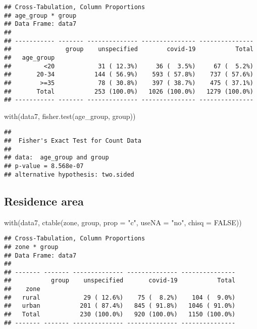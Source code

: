 \documentclass[
]{article}
\newenvironment{Shaded}{\begin{snugshade}}{\end{snugshade}}
\newcommand{\AttributeTok}[1]{\textcolor[rgb]{0.77,0.63,0.00}{#1}}
\newcommand{\ConstantTok}[1]{\textcolor[rgb]{0.00,0.00,0.00}{#1}}
\newcommand{\FunctionTok}[1]{\textcolor[rgb]{0.00,0.00,0.00}{#1}}
\newcommand{\NormalTok}[1]{#1}
\newcommand{\StringTok}[1]{\textcolor[rgb]{0.31,0.60,0.02}{#1}}
\begin{document}
\begin{verbatim}
## Cross-Tabulation, Column Proportions  
## age_group * group  
## Data Frame: data7  
## 
## ----------- ------- -------------- --------------- ---------------
##               group    unspecified        covid-19           Total
##   age_group                                                       
##         <20            31 ( 12.3%)     36 (  3.5%)     67 (  5.2%)
##       20-34           144 ( 56.9%)    593 ( 57.8%)    737 ( 57.6%)
##        >=35            78 ( 30.8%)    397 ( 38.7%)    475 ( 37.1%)
##       Total           253 (100.0%)   1026 (100.0%)   1279 (100.0%)
## ----------- ------- -------------- --------------- ---------------
\end{verbatim}

\begin{Shaded}
\begin{Highlighting}[]
\FunctionTok{with}\NormalTok{(data7, }\FunctionTok{fisher.test}\NormalTok{(age\_group, group))}
\end{Highlighting}
\end{Shaded}

\begin{verbatim}
## 
##  Fisher's Exact Test for Count Data
## 
## data:  age_group and group
## p-value = 8.568e-07
## alternative hypothesis: two.sided
\end{verbatim}

\hypertarget{residence-area}{%
\subsection{Residence area}\label{residence-area}}

\begin{Shaded}
\begin{Highlighting}[]
\FunctionTok{with}\NormalTok{(data7, }\FunctionTok{ctable}\NormalTok{(zone, group, }\AttributeTok{prop =} \StringTok{"c"}\NormalTok{, }\AttributeTok{useNA =} \StringTok{"no"}\NormalTok{, }\AttributeTok{chisq =} \ConstantTok{FALSE}\NormalTok{))}
\end{Highlighting}
\end{Shaded}

\begin{verbatim}
## Cross-Tabulation, Column Proportions  
## zone * group  
## Data Frame: data7  
## 
## ------- ------- -------------- -------------- ---------------
##           group    unspecified       covid-19           Total
##    zone                                                      
##   rural            29 ( 12.6%)    75 (  8.2%)    104 (  9.0%)
##   urban           201 ( 87.4%)   845 ( 91.8%)   1046 ( 91.0%)
##   Total           230 (100.0%)   920 (100.0%)   1150 (100.0%)
## ------- ------- -------------- -------------- ---------------
\end{verbatim}
\end{document}

